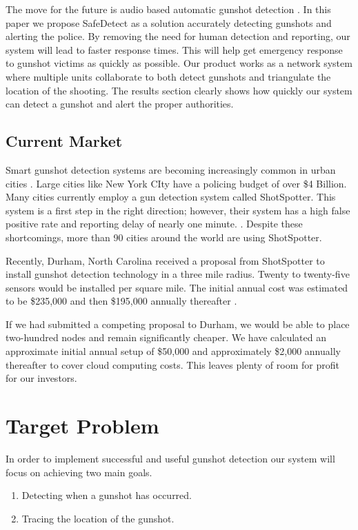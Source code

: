 \documentclass[conference]{IEEEtran}
\begin{document}
The move for the future is audio based automatic gunshot detection \cite{b7}. In this paper we propose SafeDetect as a solution accurately detecting gunshots and alerting the police. By removing the need for human detection and reporting, our system will lead to faster response times. This will help get emergency response to gunshot victims as quickly as possible. Our product works as a network system where multiple units collaborate to both detect gunshots and triangulate the location of the shooting. The results section clearly shows how quickly our system can detect a gunshot and alert the proper authorities. 


\subsection{Current Market}


Smart gunshot detection systems are becoming increasingly common in urban cities \cite{b2}. Large cities like New York CIty have a policing budget of over \$4 Billion. Many cities currently employ a gun detection system called ShotSpotter. This system is a first step in the right direction; however, their system has a high false positive rate and reporting delay of nearly one minute.  \cite{b3}. Despite these shortcomings, more than 90 cities around the world are using ShotSpotter.

Recently, Durham, North Carolina received a proposal from ShotSpotter to install gunshot detection technology in a three mile radius. Twenty to twenty-five sensors would be installed per square mile. The initial annual cost was estimated to be \$235,000 and then \$195,000 annually thereafter \cite{b4}.

If we had submitted a competing proposal to Durham, we would be able to place two-hundred nodes and remain significantly cheaper. We have calculated an approximate initial annual setup of \$50,000 and approximately \$2,000 annually thereafter to cover cloud computing costs. This leaves plenty of room for profit for our investors. 



\section{Target Problem}

In order to implement successful and useful gunshot detection our system will focus on achieving two main goals.
\begin{enumerate}
\item Detecting when a gunshot has occurred.
\item Tracing the location of the gunshot.
\end{enumerate}
\end{document}
